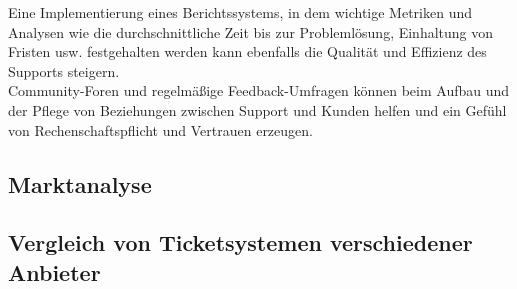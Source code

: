 Eine Implementierung eines Berichtssystems, in dem wichtige Metriken und Analysen wie die durchschnittliche Zeit bis zur Problemlösung, Einhaltung von Fristen usw. festgehalten werden kann ebenfalls die Qualität und Effizienz des Supports steigern. \\
Community-Foren und regelmäßige Feedback-Umfragen können beim Aufbau und der Pflege von Beziehungen zwischen Support und Kunden helfen und ein Gefühl von Rechenschaftspflicht und Vertrauen erzeugen. \\

  
  \subsection{Marktanalyse}
  
  
  
  \subsection{Vergleich von Ticketsystemen verschiedener Anbieter}